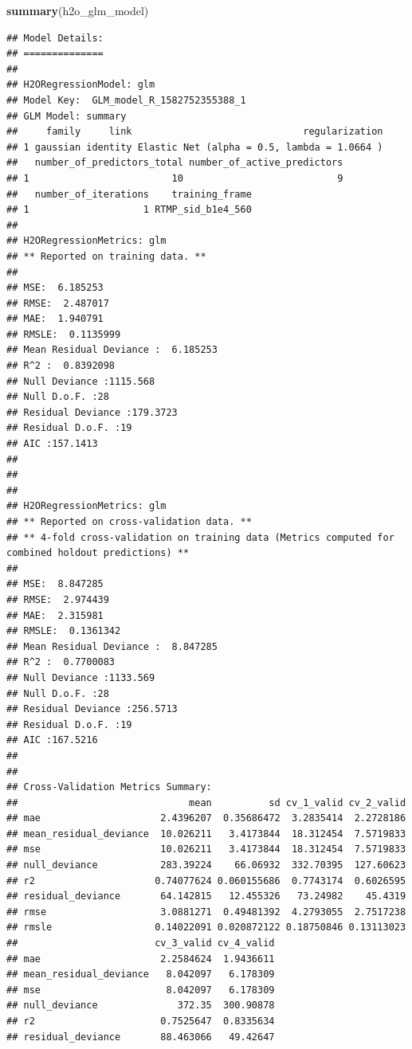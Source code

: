 \documentclass[]{book}
\newenvironment{Shaded}{\begin{snugshade}}{\end{snugshade}}
\newcommand{\KeywordTok}[1]{\textcolor[rgb]{0.13,0.29,0.53}{\textbf{#1}}}
\newcommand{\NormalTok}[1]{#1}
\begin{document}
\begin{Shaded}
\begin{Highlighting}[]
\KeywordTok{summary}\NormalTok{(h2o_glm_model)}
\end{Highlighting}
\end{Shaded}

\begin{verbatim}
## Model Details:
## ==============
## 
## H2ORegressionModel: glm
## Model Key:  GLM_model_R_1582752355388_1 
## GLM Model: summary
##     family     link                              regularization
## 1 gaussian identity Elastic Net (alpha = 0.5, lambda = 1.0664 )
##   number_of_predictors_total number_of_active_predictors
## 1                         10                           9
##   number_of_iterations    training_frame
## 1                    1 RTMP_sid_b1e4_560
## 
## H2ORegressionMetrics: glm
## ** Reported on training data. **
## 
## MSE:  6.185253
## RMSE:  2.487017
## MAE:  1.940791
## RMSLE:  0.1135999
## Mean Residual Deviance :  6.185253
## R^2 :  0.8392098
## Null Deviance :1115.568
## Null D.o.F. :28
## Residual Deviance :179.3723
## Residual D.o.F. :19
## AIC :157.1413
## 
## 
## 
## H2ORegressionMetrics: glm
## ** Reported on cross-validation data. **
## ** 4-fold cross-validation on training data (Metrics computed for combined holdout predictions) **
## 
## MSE:  8.847285
## RMSE:  2.974439
## MAE:  2.315981
## RMSLE:  0.1361342
## Mean Residual Deviance :  8.847285
## R^2 :  0.7700083
## Null Deviance :1133.569
## Null D.o.F. :28
## Residual Deviance :256.5713
## Residual D.o.F. :19
## AIC :167.5216
## 
## 
## Cross-Validation Metrics Summary: 
##                              mean          sd cv_1_valid cv_2_valid
## mae                     2.4396207  0.35686472  3.2835414  2.2728186
## mean_residual_deviance  10.026211   3.4173844  18.312454  7.5719833
## mse                     10.026211   3.4173844  18.312454  7.5719833
## null_deviance           283.39224    66.06932  332.70395  127.60623
## r2                     0.74077624 0.060155686  0.7743174  0.6026595
## residual_deviance       64.142815   12.455326   73.24982    45.4319
## rmse                    3.0881271  0.49481392  4.2793055  2.7517238
## rmsle                  0.14022091 0.020872122 0.18750846 0.13113023
##                        cv_3_valid cv_4_valid
## mae                     2.2584624  1.9436611
## mean_residual_deviance   8.042097   6.178309
## mse                      8.042097   6.178309
## null_deviance              372.35  300.90878
## r2                      0.7525647  0.8335634
## residual_deviance       88.463066   49.42647

\end{verbatim}
\end{document}
